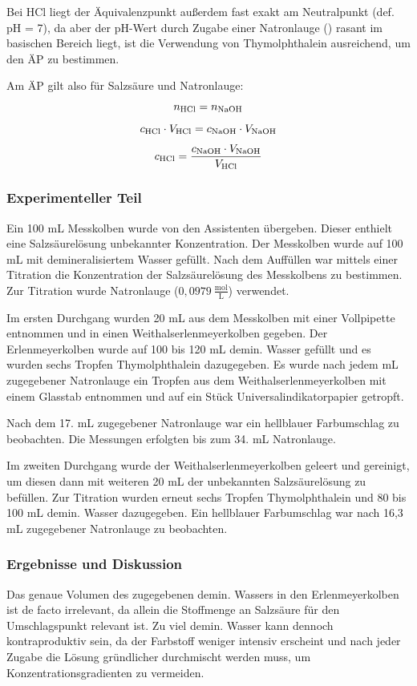 \documentclass[
	a4paper,										%
	12pt,											%
	twoside,										%
	headsepline,								%
	footsepline,									%
	captions=tableheading,					%
]{scrartcl}
\newcommand{\formel}[2]{				%
	\begin{equation}
		\label{eq: #1}							%
		#2											%
	\end{equation}}
\begin{document}
Bei HCl liegt der Äquivalenzpunkt außerdem fast exakt am Neutralpunkt (def. pH = 7),
da aber der pH-Wert durch Zugabe einer Natronlauge () rasant im basischen Bereich liegt, ist die Verwendung von Thymolphthalein ausreichend, um den ÄP zu bestimmen.

Am ÄP gilt also für Salzsäure und Natronlauge:
\formel{sf}{n_{\ce{HCl}} = n_{\ce{NaOH}}}
\formel{sf2}{c_{\ce{HCl}} \cdot V_{\ce{HCl}} = c_{\ce{NaOH}} \cdot V_{\ce{NaOH}}}
\formel{sf3}{c_{\ce{HCl}} = \frac{c_{\ce{NaOH}} \cdot V_{\ce{NaOH}}}{V_{\ce{HCl}}}}



\subsubsection{Experimenteller Teil}

Ein 100 mL Messkolben wurde von den Assistenten übergeben. Dieser enthielt eine Salzsäurelösung unbekannter Konzentration.
Der Messkolben wurde auf 100 mL mit demineralisiertem Wasser gefüllt. Nach dem Auffüllen war mittels einer Titration die Konzentration der Salzsäurelösung des Messkolbens zu bestimmen.
Zur Titration wurde Natronlauge ($0,0979 \ \mathrm{\frac{mol}{L}}$) verwendet.

Im ersten Durchgang wurden 20 mL aus dem Messkolben mit einer Vollpipette entnommen und in einen Weithalserlenmeyerkolben gegeben.
Der Erlenmeyerkolben wurde auf 100 bis 120 mL demin. Wasser gefüllt und es wurden sechs Tropfen Thymolphthalein dazugegeben.
Es wurde nach jedem mL zugegebener Natronlauge ein Tropfen aus dem Weithalserlenmeyerkolben mit einem Glasstab entnommen
und auf ein Stück Universalindikatorpapier getropft.

Nach dem 17. mL zugegebener Natronlauge war ein hellblauer Farbumschlag zu beobachten. Die Messungen erfolgten bis zum 34. mL Natronlauge.

Im zweiten Durchgang wurde der Weithalserlenmeyerkolben geleert und gereinigt, um diesen dann mit weiteren 20 mL der unbekannten Salzsäurelösung zu befüllen.
Zur Titration wurden erneut sechs Tropfen Thymolphthalein und 80 bis 100 mL demin. Wasser dazugegeben.
Ein hellblauer Farbumschlag war nach 16,3 mL zugegebener Natronlauge zu beobachten.
\newpage
\subsubsection{Ergebnisse und Diskussion}

Das genaue Volumen des zugegebenen demin. Wassers in den Erlenmeyerkolben ist de facto irrelevant,
da allein die Stoffmenge an Salzsäure für den Umschlagspunkt relevant ist.
Zu viel demin. Wasser kann dennoch kontraproduktiv sein,
da der Farbstoff weniger intensiv erscheint und nach jeder Zugabe die Lösung gründlicher durchmischt werden muss,
um Konzentrationsgradienten zu vermeiden.
\end{document}
